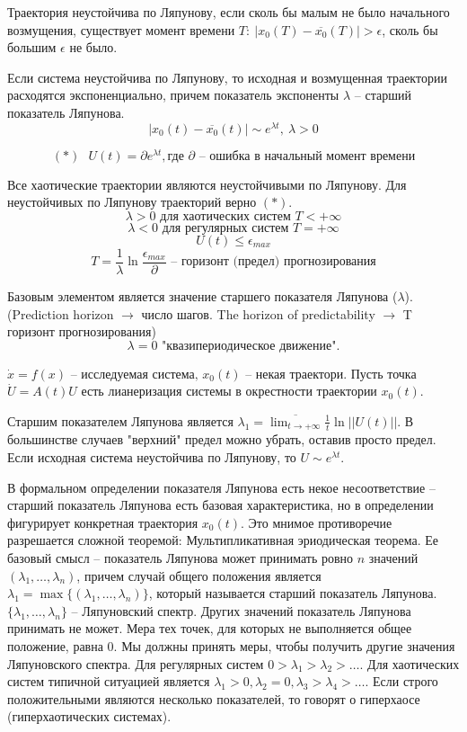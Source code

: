 \documentclass[11pt]{article}
\begin{document}
	Траектория неустойчива по Ляпунову, если сколь бы малым не было начального возмущения, существует момент времени $T:\:|x_0(T)-\overline{x_0}(T)|>\epsilon$, сколь бы большим $\epsilon$ не было.
	
	Если система неустойчива по Ляпунову, то исходная и возмущенная траектории расходятся экспоненциально, причем показатель экспоненты $\lambda$ -- старший показатель Ляпунова.
	$$ |x_0(t)-\overline{x_0}(t)|\sim e^{\lambda t},\:\lambda>0 $$
	
	$$ (*)\:\:\: U(t)=\partial e^{\lambda t}, \text{где } \partial \text{ -- ошибка в начальный момент времени}$$
	
	Все хаотические траектории являются неустойчивыми по Ляпунову. Для неустойчивых по Ляпунову траекторий верно $(*)$.
	$$ \lambda>0 \text{ для хаотических систем } T<+\infty $$
	$$ \lambda<0 \text{ для регулярных систем } T=+\infty $$
	$$ U(t)\le \epsilon_{max} $$
	$$ T=\frac{1}{\lambda}\ln \frac{\epsilon_{max}}{\partial} \text{ -- горизонт (предел) прогнозирования}$$
	
	Базовым элементом является значение старшего показателя Ляпунова ($\lambda$). (Prediction horizon $\rightarrow$ число шагов. The horizon of predictability $\rightarrow$ T горизонт прогнозирования)
	$$\lambda = 0 \text{ "квазипериодическое движение".}$$
	
	$ \dot x = f(x) \text{ -- исследуемая система, } x_0(t) \text{ -- некая траектори} $. Пусть точка $\dot U = A(t)U$ есть лианеризация системы в окрестности траектории $x_0(t)$.
	
	Старшим показателем Ляпунова является $\lambda_1 = \overline{\lim_{t\to + \infty}}\frac{1}{t} \ln || U(t)|| $. В большинстве случаев "верхний" предел можно убрать, оставив просто предел. Если исходная система неустойчива по Ляпунову, то $U\sim e^{\lambda t}$.
	
	В формальном определении показателя Ляпунова есть некое несоответствие -- старший показатель Ляпунова есть базовая характеристика, но в определении фигурирует конкретная траектория $x_0(t)$. Это мнимое противоречие разрешается сложной теоремой: Мультипликативная эриодическая теорема. Ее базовый смысл -- показатель Ляпунова может принимать ровно $n$ значений $(\lambda_1, \dots, \lambda_n)$, причем случай общего положения является $\lambda_1 = \max \{ (\lambda_1, \dots, \lambda_n)\}$, который называется старший показатель Ляпунова. $\{\lambda_1, \dots, \lambda_n\}$ -- Ляпуновский спектр. Других значений показатель Ляпунова принимать не может. Мера тех точек, для которых не выполняется общее положение, равна 0. Мы должны принять меры, чтобы получить другие значения Ляпуновского спектра. Для регулярных систем $0>\lambda_1>\lambda_2>\dots$. Для хаотических систем типичной ситуацией является $\lambda_1>0, \lambda_2 = 0, \lambda_3>\lambda_4>\dots$. Если строго положительными являются несколько показателей, то говорят о гиперхаосе (гиперхаотических системах).
	
\end{document}

